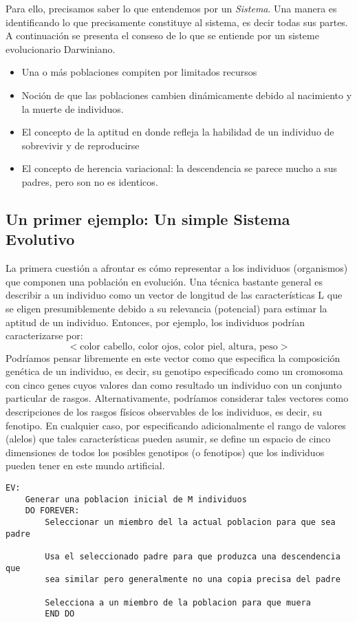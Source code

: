 \documentclass{article}
\begin{document}
Para ello, precisamos saber lo que entendemos por un \textit{Sistema}. Una manera es identificando lo que precisamente constituye al sistema, es decir todas sus partes. A continuaci\'on se presenta el conseso de lo que se entiende por un sisteme evolucionario Darwiniano.
\begin{itemize}
    \item Una o m\'as poblaciones compiten por limitados recursos
    \item Noci\'on de que las poblaciones cambien din\'amicamente debido al nacimiento y la muerte de individuos.
    \item El concepto de la aptitud en donde refleja la habilidad de un individuo de sobrevivir y de reproducirse
    \item El concepto de  herencia variacional: la descendencia se parece mucho a sus padres, pero son no es identicos.
\end{itemize}
\subsection{Un primer ejemplo: Un simple Sistema Evolutivo}
La primera cuestión a afrontar es cómo representar a los individuos (organismos) que componen una población en evolución. Una técnica bastante general es describir a un individuo como un vector de longitud de las características L que se eligen presumiblemente debido a su relevancia (potencial) para estimar la aptitud de un individuo. Entonces, por ejemplo, los individuos podrían caracterizarse por:
\begin{equation*}
    < \textrm{color cabello, color ojos, color piel, altura, peso}>
\end{equation*}
Podríamos pensar libremente en este vector como que especifica la composición genética de un individuo, es decir, su genotipo especificado como un cromosoma con cinco genes cuyos valores dan como resultado un individuo con un conjunto particular de rasgos. Alternativamente, podríamos considerar tales vectores como descripciones de los rasgos físicos observables de los individuos, es decir, su fenotipo. En cualquier caso, por especificando adicionalmente el rango de valores (alelos) que tales características pueden asumir, se define un espacio de cinco dimensiones de todos los posibles genotipos (o fenotipos) que los individuos pueden tener en este mundo artificial.
\begin{verbatim}
EV:
    Generar una poblacion inicial de M individuos
    DO FOREVER:
        Seleccionar un miembro del la actual poblacion para que sea padre
        
        Usa el seleccionado padre para que produzca una descendencia que
        sea similar pero generalmente no una copia precisa del padre
        
        Selecciona a un miembro de la poblacion para que muera
        END DO
\end{verbatim}
\end{document}

